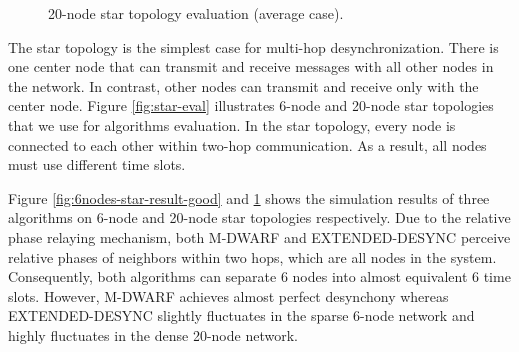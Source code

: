 \begin{figure}[!t]
{{	\label{fig:20nodes-star-result-light-good}}
}
\caption{20-node star topology evaluation (average case).}
\label{fig:20nodes-star-result-good}
\lofcont
\end{figure}
The star topology is the simplest case for multi-hop desynchronization. There is one center node that can transmit and receive messages with all other nodes in the network. In contrast, other nodes can  transmit and receive only with the center node. Figure \ref{fig:star-eval} illustrates 6-node and 20-node star topologies that we use for algorithms evaluation. In the star topology, every node is connected to each other within two-hop communication. As a result, all nodes must use different time slots. 

Figure \ref{fig:6nodes-star-result-good} and \ref{fig:20nodes-star-result-good} shows the simulation results of three algorithms on 6-node and 20-node star topologies respectively.
Due to the relative phase relaying mechanism, both M-DWARF and EXTENDED-DESYNC perceive relative phases of neighbors within two hops, which are all nodes in the system. Consequently, both algorithms can separate 6 nodes into almost equivalent 6 time slots. However, M-DWARF achieves almost perfect desynchony whereas EXTENDED-DESYNC slightly fluctuates in the sparse 6-node network and highly fluctuates in the dense 20-node network.
